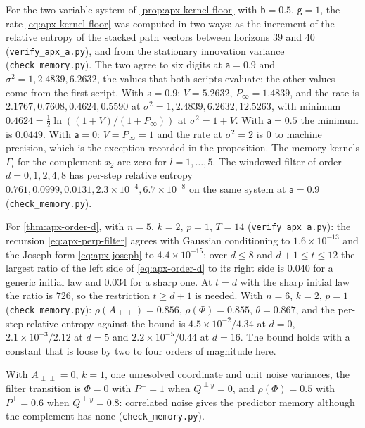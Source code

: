 \begin{numcheck}\label{chk:apx-memory}
For the two-variable system of \cref{prop:apx-kernel-floor} with $\mathsf b=0.5$, $\mathsf g=1$, the rate \cref{eq:apx-kernel-floor} was computed in two ways: as the increment of the relative entropy of the stacked path vectors between horizons $39$ and $40$ (\texttt{verify\_apx\_a.py}), and from the stationary innovation variance (\texttt{check\_memory.py}). The two agree to six digits at $\mathsf a=0.9$ and $\sigma^2=1,2.4839,6.2632$, the values that both scripts evaluate; the other values come from the first script. With $\mathsf a=0.9$: $V=5.2632$, $P_\infty=1.4839$, and the rate is $2.1767,0.7608,0.4624,0.5590$ at $\sigma^2=1,2.4839,6.2632,12.5263$, with minimum $0.4624=\frac12\ln((1+V)/(1+P_\infty))$ at $\sigma^2=1+V$. With $\mathsf a=0.5$ the minimum is $0.0449$. With $\mathsf a=0$: $V=P_\infty=1$ and the rate at $\sigma^2=2$ is $0$ to machine precision, which is the exception recorded in the proposition. The memory kernels $\Gamma_l$ for the complement $x_2$ are zero for $l=1,\dots,5$. The windowed filter of order $d=0,1,2,4,8$ has per-step relative entropy $0.761,0.0999,0.0131,2.3\times10^{-4},6.7\times10^{-8}$ on the same system at $\mathsf a=0.9$ (\texttt{check\_memory.py}).

For \cref{thm:apx-order-d}, with $n=5$, $k=2$, $p=1$, $T=14$ (\texttt{verify\_apx\_a.py}): the recursion \cref{eq:apx-perp-filter} agrees with Gaussian conditioning to $1.6\times10^{-13}$ and the Joseph form \cref{eq:apx-joseph} to $4.4\times10^{-15}$; over $d\le8$ and $d+1\le t\le12$ the largest ratio of the left side of \cref{eq:apx-order-d} to its right side is $0.040$ for a generic initial law and $0.034$ for a sharp one. At $t=d$ with the sharp initial law the ratio is $726$, so the restriction $t\ge d+1$ is needed. With $n=6$, $k=2$, $p=1$ (\texttt{check\_memory.py}): $\rho(A_{\perp\perp})=0.856$, $\rho(\Phi)=0.855$, $\theta=0.867$, and the per-step relative entropy against the bound is $4.5\times10^{-2}/4.34$ at $d=0$, $2.1\times10^{-3}/2.12$ at $d=5$ and $2.2\times10^{-5}/0.44$ at $d=16$. The bound holds with a constant that is loose by two to four orders of magnitude here.

With $A_{\perp\perp}=0$, $k=1$, one unresolved coordinate and unit noise variances, the filter transition is $\Phi=0$ with $P^\perp=1$ when $Q^{\perp y}=0$, and $\rho(\Phi)=0.5$ with $P^\perp=0.6$ when $Q^{\perp y}=0.8$: correlated noise gives the predictor memory although the complement has none (\texttt{check\_memory.py}).
\end{numcheck}

